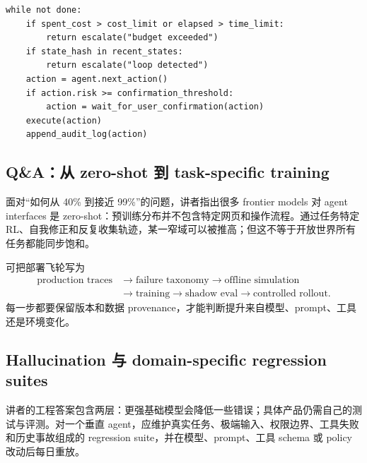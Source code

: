 \begin{lstlisting}[caption={带预算、重复检测与人工接管的执行循环}]
while not done:
    if spent_cost > cost_limit or elapsed > time_limit:
        return escalate("budget exceeded")
    if state_hash in recent_states:
        return escalate("loop detected")
    action = agent.next_action()
    if action.risk >= confirmation_threshold:
        action = wait_for_user_confirmation(action)
    execute(action)
    append_audit_log(action)
\end{lstlisting}

\subsection{Q\&A：从 zero-shot 到 task-specific training}

面对“如何从 40\% 到接近 99\%”的问题，讲者指出很多 frontier models 对 agent interfaces 是 zero-shot：预训练分布并不包含特定网页和操作流程。通过任务特定 RL、自我修正和反复收集轨迹，某一窄域可以被推高；但这不等于开放世界所有任务都能同步饱和。


可把部署飞轮写为
\[
\begin{aligned}
\text{production traces}&\rightarrow\text{failure taxonomy}
\rightarrow\text{offline simulation}\\
&\rightarrow\text{training}\rightarrow\text{shadow eval}
\rightarrow\text{controlled rollout}.
\end{aligned}
\]
每一步都要保留版本和数据 provenance，才能判断提升来自模型、prompt、工具还是环境变化。

\subsection{Hallucination 与 domain-specific regression suites}

讲者的工程答案包含两层：更强基础模型会降低一些错误；具体产品仍需自己的测试与评测。对一个垂直 agent，应维护真实任务、极端输入、权限边界、工具失败和历史事故组成的 regression suite，并在模型、prompt、工具 schema 或 policy 改动后每日重放。


